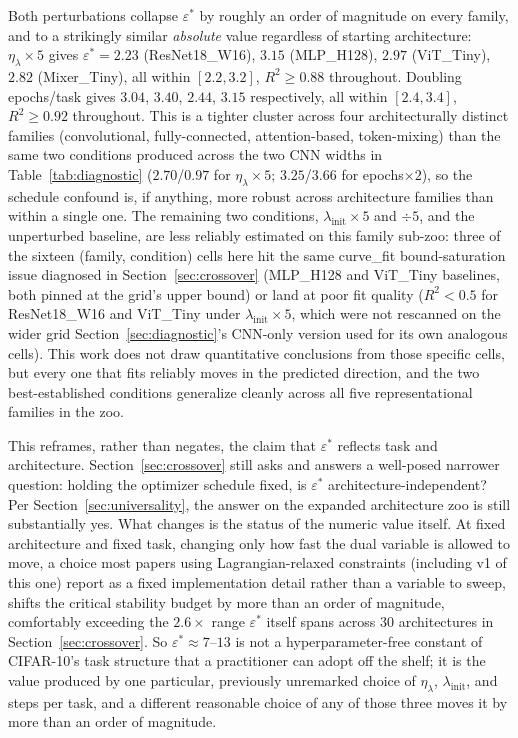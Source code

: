 \documentclass[11pt]{article}
\newcommand{\eps}{\varepsilon}
\newcommand{\epsstar}{\eps^{*}}
\begin{document}
Both perturbations collapse $\epsstar$ by roughly an order of magnitude on
every family, and to a strikingly similar \emph{absolute} value regardless
of starting architecture: $\eta_\lambda\times5$ gives $\epsstar=2.23$
(ResNet18\_W16), $3.15$ (MLP\_H128), $2.97$ (ViT\_Tiny), $2.82$
(Mixer\_Tiny), all within $[2.2,3.2]$, $R^2\ge0.88$ throughout. Doubling
epochs/task gives $3.04$, $3.40$, $2.44$, $3.15$ respectively, all within
$[2.4,3.4]$, $R^2\ge0.92$ throughout. This is a tighter cluster across four
architecturally distinct families (convolutional, fully-connected,
attention-based, token-mixing) than the same two conditions produced across
the two CNN widths in Table~\ref{tab:diagnostic} ($2.70$/$0.97$ for
$\eta_\lambda\times5$; $3.25$/$3.66$ for epochs$\times2$), so the schedule
confound is, if anything, more robust across architecture families than
within a single one. The remaining two conditions, $\lambda_{\mathrm{init}}\times5$
and $\div5$, and the unperturbed baseline, are less reliably estimated on
this family sub-zoo: three of the sixteen (family, condition) cells here
hit the same curve\_fit bound-saturation issue diagnosed in
Section~\ref{sec:crossover} (MLP\_H128 and ViT\_Tiny baselines, both
pinned at the grid's upper bound) or land at poor fit quality ($R^2<0.5$
for ResNet18\_W16 and ViT\_Tiny under $\lambda_{\mathrm{init}}\times5$, which
were not rescanned on the wider grid Section~\ref{sec:diagnostic}'s
CNN-only version used for its own analogous cells). This work does not draw
quantitative conclusions from those specific cells, but every one that
fits reliably moves in the predicted direction, and the two
best-established conditions generalize cleanly across all five
representational families in the zoo.

This reframes, rather than negates, the claim that $\epsstar$ reflects task
and architecture. Section~\ref{sec:crossover} still asks and answers a
well-posed narrower question: holding the optimizer schedule fixed, is
$\epsstar$ architecture-independent? Per Section~\ref{sec:universality}, the
answer on the expanded architecture zoo is still substantially yes. What
changes is the status of the numeric value itself. At fixed architecture and
fixed task, changing only how fast the dual variable is allowed to move, a
choice most papers using Lagrangian-relaxed constraints (including v1 of
this one) report as a fixed implementation detail rather than a variable to
sweep, shifts the critical stability budget by more than an order of
magnitude, comfortably exceeding the $2.6\times$ range $\epsstar$ itself
spans across 30 architectures in
Section~\ref{sec:crossover}. So
$\epsstar\approx7$--$13$ is not a hyperparameter-free constant of CIFAR-10's
task structure that a practitioner can adopt off the shelf; it is the value
produced by one particular, previously unremarked choice of $\eta_\lambda$,
$\lambda_{\mathrm{init}}$, and steps per task, and a different reasonable
choice of any of those three moves it by more than an order of magnitude.
\end{document}
